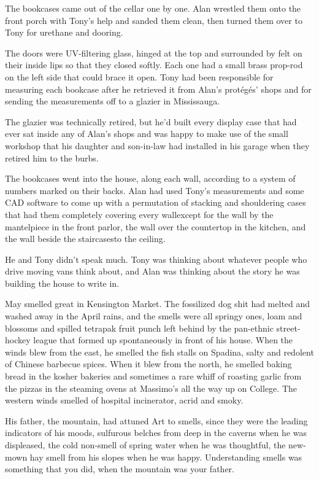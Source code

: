 The bookcases came out of the cellar one by one.  Alan wrestled them
onto the front porch with Tony's help and sanded them clean, then
turned them over to Tony for urethane and dooring.

The doors were UV-filtering glass, hinged at the top and surrounded by
felt on their inside lips so that they closed softly.  Each one had a
small brass prop-rod on the left side that could brace it open.  Tony
had been responsible for measuring each bookcase after he retrieved it
from Alan's prot\'{e}g\'{e}s' shops and for sending the measurements off
to a glazier in Mississauga.

The glazier was technically retired, but he'd built every display case
that had ever sat inside any of Alan's shops and was happy to make use
of the small workshop that his daughter and son-in-law had installed
in his garage when they retired him to the burbs.

The bookcases went into the house, along each wall, according to a
system of numbers marked on their backs.  Alan had used Tony's
measurements and some CAD software to come up with a permutation of
stacking and shouldering cases that had them completely covering every
wall\dash{}except for the wall by the mantelpiece in the front parlor, the
wall over the countertop in the kitchen, and the wall beside the
staircases\dash{}to the ceiling.

He and Tony didn't speak much.  Tony was thinking about whatever
people who drive moving vans think about, and Alan was thinking about
the story he was building the house to write in.

May smelled great in Kensington Market.  The fossilized dog shit had
melted and washed away in the April rains, and the smells were all
springy ones, loam and blossoms and spilled tetrapak fruit punch left
behind by the pan-ethnic street-hockey league that formed up
spontaneously in front of his house.  When the winds blew from the
east, he smelled the fish stalls on Spadina, salty and redolent of
Chinese barbecue spices.  When it blew from the north, he smelled
baking bread in the kosher bakeries and sometimes a rare whiff of
roasting garlic from the pizzas in the steaming ovens at Massimo's all
the way up on College.  The western winds smelled of hospital
incinerator, acrid and smoky.

His father, the mountain, had attuned Art to smells, since they were
the leading indicators of his moods, sulfurous belches from deep in
the caverns when he was displeased, the cold non-smell of spring water
when he was thoughtful, the new-mown hay smell from his slopes when he
was happy.  Understanding smells was something that you did, when the
mountain was your father.

